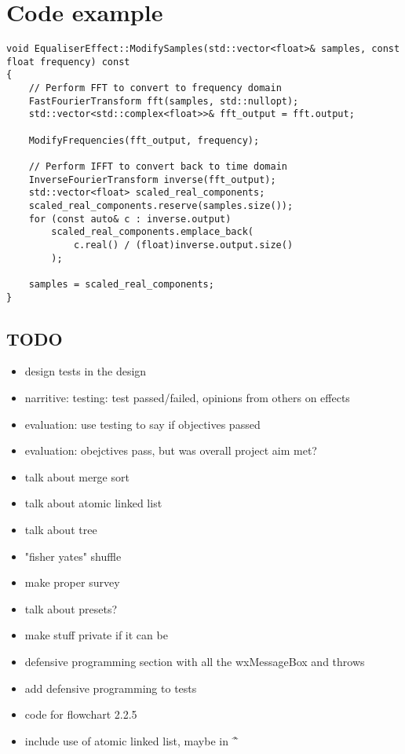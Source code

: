 \documentclass{article}
\begin{document}
	\section { Code example }
		\begin{verbatim}
void EqualiserEffect::ModifySamples(std::vector<float>& samples, const float frequency) const
{
	// Perform FFT to convert to frequency domain
	FastFourierTransform fft(samples, std::nullopt);
	std::vector<std::complex<float>>& fft_output = fft.output;

	ModifyFrequencies(fft_output, frequency);

	// Perform IFFT to convert back to time domain
	InverseFourierTransform inverse(fft_output);
	std::vector<float> scaled_real_components;
	scaled_real_components.reserve(samples.size());
	for (const auto& c : inverse.output)
		scaled_real_components.emplace_back(
			c.real() / (float)inverse.output.size()
		);

	samples = scaled_real_components;
}
	\end{verbatim}
	
	\subsection{TODO}
	\begin{itemize}
		\item design tests in the design
		\item narritive: testing: test passed/failed, opinions from others on effects
		\item evaluation: use testing to say if objectives passed
		\item evaluation: obejctives pass, but was overall project aim met?
		\item talk about merge sort
		\item talk about atomic linked list
		\item talk about tree
		\item "fisher yates" shuffle
		\item make proper survey
		\item talk about presets?
		\item make stuff private if it can be
		\item defensive programming section with all the wxMessageBox and throws
		\item add defensive programming to tests
		\item code for flowchart 2.2.5
		\item include use of atomic linked list, maybe in \^\^
	\end{itemize}
	
\end{document}
